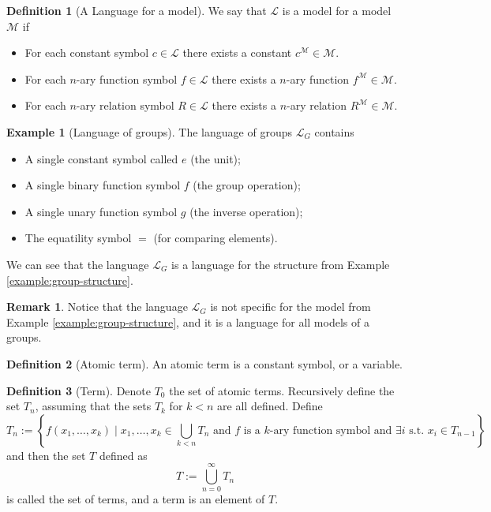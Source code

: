 \documentclass[11pt,a4paper]{article}
\theoremstyle{definition}
\newtheorem{definition}{Definition}[section]
\newtheorem{remark}{Remark}[section]
\newtheorem{example}{Example}[section]
\theoremstyle{plain}
\newcommand{\M}{\mathcal{M}}
\renewcommand{\L}{\mathcal{L}}
\newcommand{\st}{\text{ s.t. }}
\newcommand{\set}[2]{ \left\{ #1 \mid #2 \right\} }
\begin{document}
  \begin{definition}[A Language for a model]
    We say that $\L$ is a model for a model $\M$ if
    \begin{itemize}
      \item For each constant symbol $c \in \mathcal L$ there exists a constant
        $c^\M \in \M$.
      \item For each $n$-ary function symbol $f \in \mathcal L$ there exists 
        a $n$-ary function $f^\M \in \M$.
      \item For each $n$-ary relation symbol $R \in \mathcal L$ there exists 
        a $n$-ary relation $R^\M \in \M$.
    \end{itemize}
  \end{definition}

  \begin{example}[Language of groups]
    The language of groups $\L_G$ contains
    \begin{itemize}
      \item A single constant symbol called $e$ (the unit);
      \item A single binary function symbol $f$ (the group operation);
      \item A single unary function symbol $g$ (the inverse operation);
      \item The equatility symbol $=$ (for comparing elements).
    \end{itemize}
    We can see that the language $\L_G$ is a language for the structure
    from Example \ref{example:group-structure}.
  \end{example}
  \begin{remark}
    Notice that the language $\L_G$ is not specific for the model from
    Example \ref{example:group-structure}, and it is a language for
    all models of a groups.
  \end{remark}

  \begin{definition}[Atomic term]
    An atomic term is a constant symbol, or a variable.
  \end{definition}

  \begin{definition}[Term]
    Denote $T_0$ the set of atomic terms.
    Recursively define the set $T_n$, assuming that the sets $T_k$ for $k < n$
    are all defined. Define
    \[
      T_n := \set{f(x_1,\dots,x_k)}
      {x_1,\dots,x_k \in \bigcup_{k < n} T_n \text{ and $f$ is a $k$-ary 
      function symbol and } \exists i \st x_i \in T_{n-1}}
    \]
    and then the set $T$ defined as
    \[
      T := \bigcup_{n=0}^{\infty} T_n
    \]
    is called the set of terms, and a term is an element of $T$.
  \end{definition}
\end{document}
